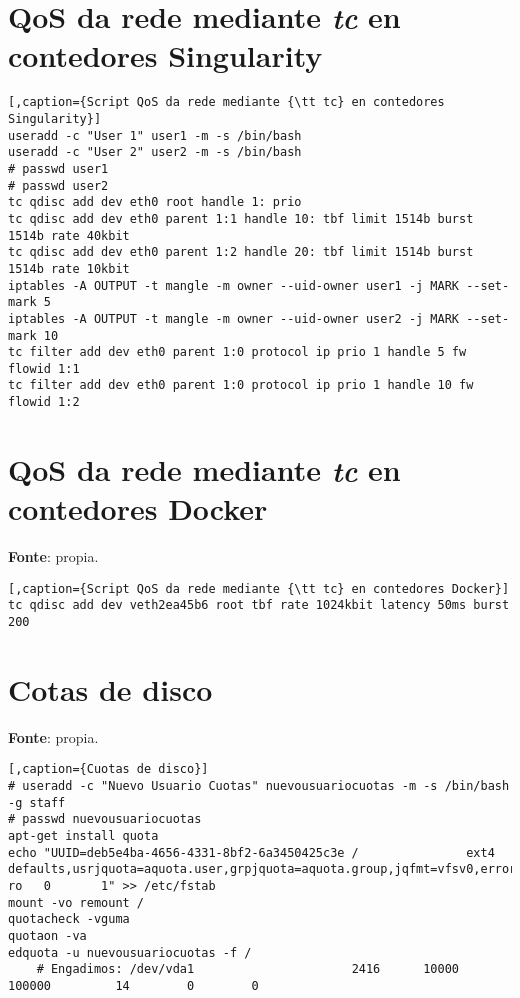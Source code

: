 \section{\gls{QoS} da rede mediante \textit{tc} en contedores Singularity}
\label{scriptQoSSingularity}

\begin{lstlisting}[,caption={Script QoS da rede mediante {\tt tc} en contedores Singularity}]
useradd -c "User 1" user1 -m -s /bin/bash
useradd -c "User 2" user2 -m -s /bin/bash
# passwd user1
# passwd user2
tc qdisc add dev eth0 root handle 1: prio
tc qdisc add dev eth0 parent 1:1 handle 10: tbf limit 1514b burst 1514b rate 40kbit
tc qdisc add dev eth0 parent 1:2 handle 20: tbf limit 1514b burst 1514b rate 10kbit
iptables -A OUTPUT -t mangle -m owner --uid-owner user1 -j MARK --set-mark 5
iptables -A OUTPUT -t mangle -m owner --uid-owner user2 -j MARK --set-mark 10
tc filter add dev eth0 parent 1:0 protocol ip prio 1 handle 5 fw flowid 1:1
tc filter add dev eth0 parent 1:0 protocol ip prio 1 handle 10 fw flowid 1:2
\end{lstlisting}


\section{\gls{QoS} da rede mediante \textit{tc} en contedores Docker}
\label{scriptQoSDocker}

\textbf{Fonte}: propia.

\begin{lstlisting}[,caption={Script QoS da rede mediante {\tt tc} en contedores Docker}]
tc qdisc add dev veth2ea45b6 root tbf rate 1024kbit latency 50ms burst 200
\end{lstlisting}


\section{Cotas de disco}
\label{scriptQuotas}

\textbf{Fonte}: propia.

\begin{lstlisting}[,caption={Cuotas de disco}]
# useradd -c "Nuevo Usuario Cuotas" nuevousuariocuotas -m -s /bin/bash -g staff
# passwd nuevousuariocuotas
apt-get install quota
echo "UUID=deb5e4ba-4656-4331-8bf2-6a3450425c3e /               ext4    defaults,usrjquota=aquota.user,grpjquota=aquota.group,jqfmt=vfsv0,errors=remount-ro   0       1" >> /etc/fstab
mount -vo remount /
quotacheck -vguma
quotaon -va
edquota -u nuevousuariocuotas -f /
    # Engadimos: /dev/vda1                      2416      10000     100000         14        0        0
\end{lstlisting}